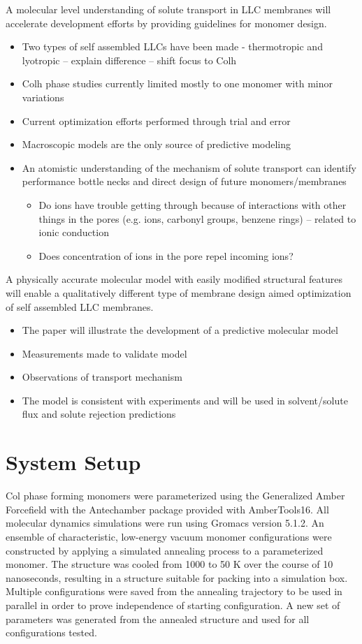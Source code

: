 \documentclass{article}
\begin{document}
	A molecular level understanding of solute transport in LLC membranes will accelerate development efforts by providing guidelines for monomer design.
	\begin{itemize}
		\item Two types of self assembled LLCs have been made - thermotropic and lyotropic -- explain difference -- shift focus to Colh
		\item Colh phase studies currently limited mostly to one monomer with minor variations
		\item Current optimization efforts performed through trial and error
		\item Macroscopic models are the only source of predictive modeling
		\item An atomistic understanding of the mechanism of solute transport can identify
		performance bottle necks and direct design of future monomers/membranes
		\begin{itemize}
			\item Do ions have trouble getting through because of interactions with other things in the pores (e.g. ions, carbonyl groups, benzene rings) -- related to ionic conduction
			\item Does concentration of ions in the pore repel incoming ions?
		\end{itemize}
	\end{itemize}
	A physically accurate molecular model with easily modified structural features will enable a qualitatively different type of membrane design aimed optimization of self assembled LLC membranes.
	\begin{itemize}
		\item The paper will illustrate the development of a predictive molecular model
		\item Measurements made to validate model
		\item Observations of transport mechanism
		\item The model is consistent with experiments and will be used in solvent/solute flux and solute rejection predictions
	\end{itemize}
	
	\section{System Setup}
	
	Col phase forming monomers were parameterized using the Generalized Amber Forcefield with the Antechamber package provided with AmberTools16. All molecular dynamics simulations were run using Gromacs version 5.1.2. An ensemble of characteristic, low-energy vacuum monomer configurations were constructed by applying a simulated annealing process to a parameterized monomer. The structure was cooled from 1000 to 50 K over the course of 10 nanoseconds, resulting in a structure suitable for packing into a simulation box. Multiple configurations were saved from the annealing trajectory to be used in parallel in order to prove independence of starting configuration. A new set of parameters was generated from the annealed structure and used for all configurations tested.
\end{document}
